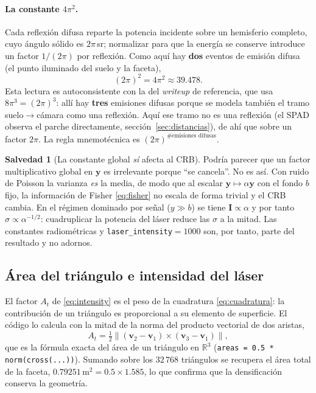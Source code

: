 \documentclass[11pt,a4paper]{article}
\newcommand{\vect}[1]{\boldsymbol{#1}}
\newcommand{\matr}[1]{\mathbf{#1}}
\newcommand{\code}[1]{\texttt{#1}}
\theoremstyle{definition}
\newtheorem{salvedad}{Salvedad}
\theoremstyle{plain}
\begin{document}
\paragraph{La constante $4\pi^2$.}
Cada reflexión difusa reparte la potencia incidente sobre un hemisferio
completo, cuyo ángulo sólido es $2\pi\,$sr; normalizar para que la energía se
conserve introduce un factor $1/(2\pi)$ por reflexión. Como aquí hay
\textbf{dos} eventos de emisión difusa (el punto iluminado del suelo y la
faceta),
%
\begin{equation}
\label{eq:4pi2}
(2\pi)^2 = 4\pi^2 \approx 39.478 .
\end{equation}
%
Esta lectura es autoconsistente con la del \emph{writeup} de referencia, que usa
$8\pi^3=(2\pi)^3$: allí hay \textbf{tres} emisiones difusas porque se modela
también el tramo suelo$\to$cámara como una reflexión. Aquí ese tramo no es una
reflexión (el SPAD observa el parche directamente, sección~\ref{sec:distancias}),
de ahí que sobre un factor $2\pi$. La regla mnemotécnica es
$(2\pi)^{\#\text{emisiones difusas}}$.

\begin{salvedad}[La constante global \emph{sí} afecta al CRB]
\label{sal:constante}
Podría parecer que un factor multiplicativo global en $\vect y$ es irrelevante
porque \enquote{se cancela}. No es así. Con ruido de Poisson la varianza
\emph{es} la media, de modo que al escalar $\vect y\mapsto\alpha\vect y$ con el
fondo $b$ fijo, la información de Fisher \eqref{eq:fisher} no escala de forma
trivial y el CRB cambia. En el régimen dominado por señal ($y\gg b$) se tiene
$\matr I\propto\alpha$ y por tanto $\sigma\propto\alpha^{-1/2}$: cuadruplicar la
potencia del láser reduce las $\sigma$ a la mitad. Las constantes radiométricas
y \code{laser\_intensity}$=1000$ son, por tanto, parte del resultado y no
adornos.
\end{salvedad}

\subsection{Área del triángulo e intensidad del láser}
\label{sec:area}

El factor $A_t$ de \eqref{eq:intensity} es el peso de la cuadratura
\eqref{eq:cuadratura}: la contribución de un triángulo es proporcional a su
elemento de superficie. El código lo calcula con la mitad de la norma del
producto vectorial de dos aristas,
%
\begin{equation}
A_t = \tfrac12\bigl\lVert (\vect v_2-\vect v_1)\times(\vect v_3-\vect v_1)\bigr\rVert ,
\end{equation}
%
que es la fórmula exacta del área de un triángulo en $\mathbb R^3$
(\code{areas = 0.5 * norm(cross(...))}). Sumando sobre los $32\,768$ triángulos
se recupera el área total de la faceta, $0.79251\,\text{m}^2 = 0.5\times1.585$,
lo que confirma que la densificación conserva la geometría.
\end{document}
